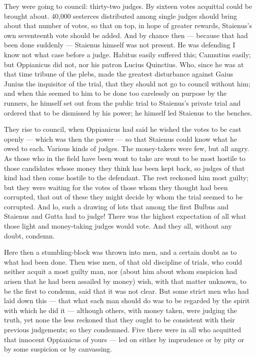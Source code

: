  They were going to council: thirty-two judges. By sixteen votes acquittal could be brought about. 40,000 sesterces distributed among single judges should bring about that number of votes, so that on top, in hope of greater rewards, Staienus's own seventeenth vote should be added. And by chance then --- because that had been done suddenly --- Staienus himself was not present. He was defending I know not what case before a judge. Habitus easily suffered this; Cannutius easily; but Oppianicus did not, nor his patron Lucius Quinctius. Who, since he was at that time tribune of the plebs, made the greatest disturbance against Gaius Junius the inquisitor of the trial, that they should not go to council without him; and when this seemed to him to be done too carelessly on purpose by the runners, he himself set out from the public trial to Staienus's private trial and ordered that to be dismissed by his power; he himself led Staienus to the benches.

 They rise to council, when Oppianicus had said he wished the votes to be cast openly --- which was then the power --- so that Staienus could know what he owed to each. Various kinds of judges. The money-takers were few, but all angry. As those who in the field have been wont to take are wont to be most hostile to those candidates whose money they think has been kept back, so judges of that kind had then come hostile to the defendant. The rest reckoned him most guilty; but they were waiting for the votes of those whom they thought had been corrupted, that out of these they might decide by whom the trial seemed to be corrupted. And lo, such a drawing of lots that among the first Bulbus and Staienus and Gutta had to judge! There was the highest expectation of all what those light and money-taking judges would vote. And they all, without any doubt, condemn.

 Here then a stumbling-block was thrown into men, and a certain doubt as to what had been done. Then wise men, of that old discipline of trials, who could neither acquit a most guilty man, nor (about him about whom suspicion had arisen that he had been assailed by money) wish, with that matter unknown, to be the first to condemn, said that it was not clear. But some strict men who had laid down this --- that what each man should do was to be regarded by the spirit with which he did it --- although others, with money taken, were judging the truth, yet none the less reckoned that they ought to be consistent with their previous judgements; so they condemned. Five there were in all who acquitted that innocent Oppianicus of yours --- led on either by imprudence or by pity or by some suspicion or by canvassing.

